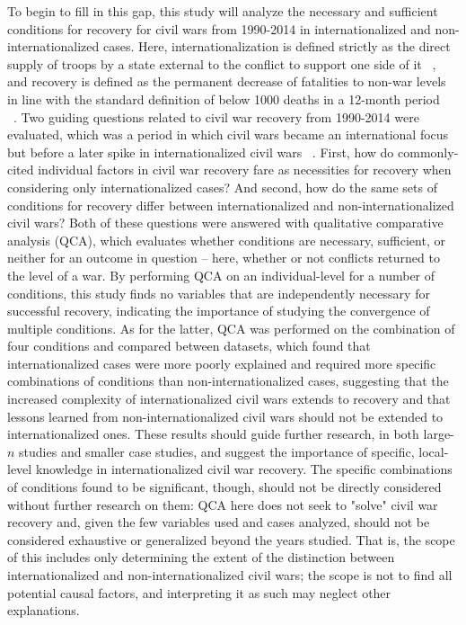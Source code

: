 \documentclass{article}
\begin{document}
To begin to fill in this gap, this study will analyze the necessary and sufficient conditions for recovery for civil wars from 1990-2014 in internationalized and non-internationalized cases. Here, internationalization is defined strictly as the direct supply of troops by a state external to the conflict to support one side of it ~\cite{sarkees}, and recovery is defined as the permanent decrease of fatalities to non-war levels in line with the standard definition of below 1000 deaths in a 12-month period ~\cite{cow} ~\cite{caplan}. Two guiding questions related to civil war recovery from 1990-2014 were evaluated, which was a period in which civil wars became an international focus but before a later spike in internationalized civil wars ~\cite{bellamy}. First, how do commonly-cited individual factors in civil war recovery fare as necessities for recovery when considering only internationalized cases? And second, how do the same sets of conditions for recovery differ between internationalized and non-internationalized civil wars? Both of these questions were answered with qualitative comparative analysis (QCA), which evaluates whether conditions are necessary, sufficient, or neither for an outcome in question -- here, whether or not conflicts returned to the level of a war. By performing QCA on an individual-level for a number of conditions, this study finds no variables that are independently necessary for successful recovery, indicating the importance of studying the convergence of multiple conditions. As for the latter, QCA was performed on the combination of four conditions and compared between datasets, which found that internationalized cases were more poorly explained and required more specific combinations of conditions than non-internationalized cases, suggesting that the increased complexity of internationalized civil wars extends to recovery and that lessons learned from non-internationalized civil wars should not be extended to internationalized ones. These results should guide further research, in both large-$n$ studies and smaller case studies, and suggest the importance of specific, local-level knowledge in internationalized civil war recovery. The specific combinations of conditions found to be significant, though, should not be directly considered without further research on them: QCA here does not seek to "solve" civil war recovery and, given the few variables used and cases analyzed, should not be considered exhaustive or generalized beyond the years studied. That is, the scope of this includes only determining the extent of the distinction between internationalized and non-internationalized civil wars; the scope is not to find all potential causal factors, and interpreting it as such may neglect other explanations.
\end{document}
